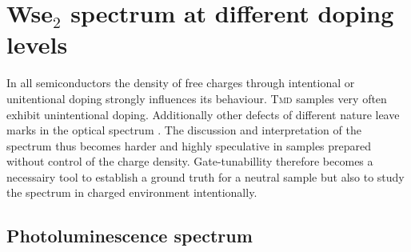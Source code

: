 \section{Ws\textup{e}$_2$ spectrum at different doping levels}

In all semiconductors the density of free charges through intentional or unitentional doping strongly influences its behaviour. \textsc{Tmd} samples very often exhibit unintentional doping\cite{kang_origin_2017, eshun_doping_2015}. Additionally other defects of different nature leave marks in the optical spectrum \cite{chow_defect-induced_2015,lin_defect_2016}. The discussion and interpretation of the spectrum thus becomes harder and highly speculative in samples prepared without control of the charge density. Gate-tunabillity therefore becomes a necessairy tool to establish a ground truth for a neutral sample but also to study the spectrum in charged environment intentionally.

\subsection{Photoluminescence spectrum}

